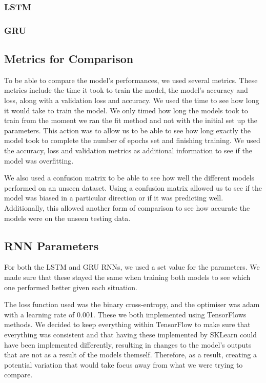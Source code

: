 \documentclass[a4paper,10pt]{article}
\begin{document}
	\subsubsection{LSTM}
		
	\subsubsection{GRU}
		

\subsection{Metrics for Comparison}
	To be able to compare the model's performances, we used several metrics. These metrics include the time it took to train the model, the model's accuracy and loss, along with a validation loss and accuracy. We used the time to see how long it would take to train the model. We only timed how long the models took to train from the moment we ran the fit method and not with the initial set up the parameters. This action was to allow us to be able to see how long exactly the model took to complete the number of epochs set and finishing training. We used the accuracy, loss and validation metrics as additional information to see if the model was overfitting. 

	We also used a confusion matrix to be able to see how well the different models performed on an unseen dataset. Using a confusion matrix allowed us to see if the model was biased in a particular direction or if it was predicting well. Additionally, this allowed another form of comparison to see how accurate the models were on the unseen testing data.
	
	

\subsection{RNN Parameters}
	For both the LSTM and GRU RNNs, we used a set value for the parameters. We made sure that these stayed the same when training both models to see which one performed better given each situation. 
	
	The loss function used was the binary cross-entropy, and the optimiser was adam with a learning rate of 0.001. These we both implemented using TensorFlows methods. We decided to keep everything within TensorFlow to make sure that everything was consistent and that having these implemented by SKLearn could have been implemented differently, resulting in changes to the model's outputs that are not as a result of the models themself. Therefore, as a result, creating a potential variation that would take focus away from what we were trying to compare.
	
\end{document}
